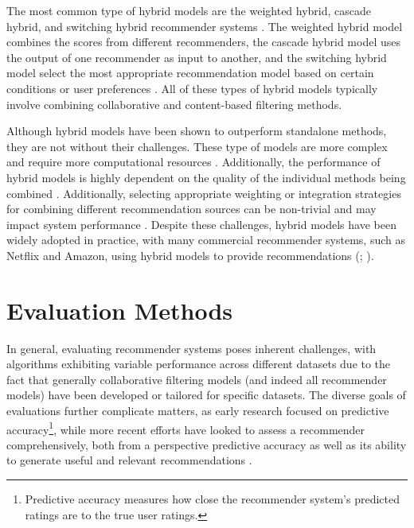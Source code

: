 The most common type of hybrid models are the weighted hybrid, cascade hybrid, and switching hybrid recommender systems \cite{ccano2017hybrid}. The weighted hybrid model combines the scores from different recommenders, the cascade hybrid model uses the output of one recommender as input to another, and the switching hybrid model select the most appropriate recommendation model based on certain conditions or user preferences \cite{ccano2017hybrid}. All of these types of hybrid models typically involve combining collaborative and content-based filtering methods. 

Although hybrid models have been shown to outperform standalone methods, they are not without their challenges. These type of models are more complex and require more computational resources \cite{ccano2017hybrid}. Additionally, the performance of hybrid models is highly dependent on the quality of the individual methods being combined \cite{ccano2017hybrid}. Additionally, selecting appropriate weighting or integration strategies for combining different recommendation sources can be non-trivial and may impact system performance \cite{thorat2015survey}. Despite these challenges, hybrid models have been widely adopted in practice, with many commercial recommender systems, such as Netflix and Amazon, using hybrid models to provide recommendations (\cite{ccano2017hybrid}; \cite{thorat2015survey}).

\section{Evaluation Methods}
\label{sec:2 Evaluation Methods}

In general, evaluating recommender systems poses inherent challenges, with algorithms exhibiting variable performance across different datasets \cite{herlocker2004evaluating} due to the fact that generally collaborative filtering models (and indeed all recommender models) have been developed or tailored for specific datasets. The diverse goals of evaluations further complicate matters, as early research focused on predictive accuracy\footnote{Predictive accuracy measures how close the recommender system’s predicted ratings are to the true user ratings.}, while more recent efforts have looked to assess a recommender comprehensively, both from a perspective predictive accuracy as well as its ability to generate useful and relevant recommendations \cite{zangerle2022evaluating}. 

